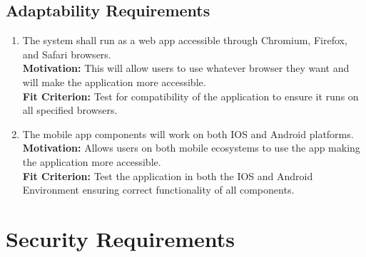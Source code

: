 \documentclass[12pt]{article}
\begin{document}
\subsection{Adaptability Requirements}
\begin{enumerate}[align=left,
  leftmargin=*,
  labelsep=1em,
  itemindent=0em,
  label=\bfseries AD-\arabic*:,
  ref=\bfseries AD-\arabic*]
  \item \label{MSAR1} The system shall run as a web app accessible through Chromium, Firefox, and Safari browsers. \\[2mm]
    {\bf Motivation:} This will allow users to use whatever browser they want and will make the application more accessible. \\
    {\bf Fit Criterion:} Test for compatibility of the application to ensure it runs on all specified browsers.
  \item \label{MSAR2} The mobile app components will work on both IOS and Android platforms. \\[2mm]
    {\bf Motivation:} Allows users on both mobile ecosystems to use the app making the application more accessible. \\
    {\bf Fit Criterion:} Test the application in both the IOS and Android Environment ensuring correct functionality of all components.
\end{enumerate}

\section{Security Requirements}
\end{document}

